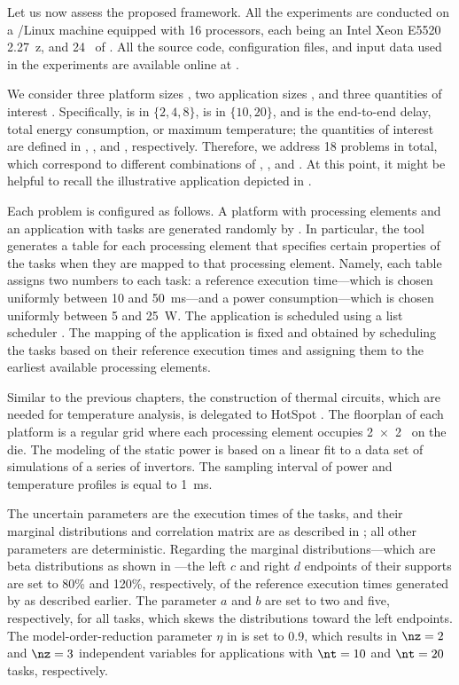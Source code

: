 Let us now assess the proposed framework. All the experiments are conducted on a
/Linux machine equipped with 16 processors, each being an Intel Xeon
E5520 2.27~z, and 24~ of . All the source code,
configuration files, and input data used in the experiments are available online
at \cite{eslab2017a}.

We consider three platform sizes \np, two application sizes \nt, and three
quantities of interest \g. Specifically, \np is in $\{ 2, 4, 8 \}$, \nt is in
$\{ 10, 20 \}$, and \g is the end-to-end delay, total energy consumption, or
maximum temperature; the quantities of interest are defined in
, , and ,
respectively. Therefore, we address 18 problems in total, which correspond to
different combinations of \np, \nt, and \g. At this point, it might be helpful
to recall the illustrative application depicted in .

Each problem is configured as follows. A platform with \np processing elements
and an application with \nt tasks are generated randomly by 
\cite{dick1998}. In particular, the tool generates a table for each processing
element that specifies certain properties of the tasks when they are mapped to
that processing element. Namely, each table assigns two numbers to each task: a
reference execution time---which is chosen uniformly between 10 and 50~ms---and
a power consumption---which is chosen uniformly between 5 and 25~W. The
application is scheduled using a list scheduler \cite{adam1974}. The mapping of
the application is fixed and obtained by scheduling the tasks based on their
reference execution times and assigning them to the earliest available
processing elements.

Similar to the previous chapters, the construction of thermal  circuits,
which are needed for temperature analysis, is delegated to HotSpot
\cite{skadron2003}. The floorplan of each platform is a regular grid where each
processing element occupies 2~×~2~ on the die. The modeling of the
static power is based on a linear fit to a data set of  simulations of
a series of  invertors. The sampling interval of power and temperature
profiles is equal to 1~ms.

The uncertain parameters \vu are the execution times of the tasks, and their
marginal distributions and correlation matrix are as described in
; all other parameters are deterministic.
Regarding the marginal distributions---which are beta distributions as shown in
---the left $c$ and right $d$ endpoints of their
supports are set to 80\% and 120\%, respectively, of the reference execution
times generated by  as described earlier. The parameter $a$ and $b$ are
set to two and five, respectively, for all tasks, which skews the distributions
toward the left endpoints. The model-order-reduction parameter $\eta$ in
 is set to 0.9, which results in $\nz = 2$ and $\nz
= 3$ independent variables for applications with $\nt = 10$ and $\nt = 20$
tasks, respectively.

